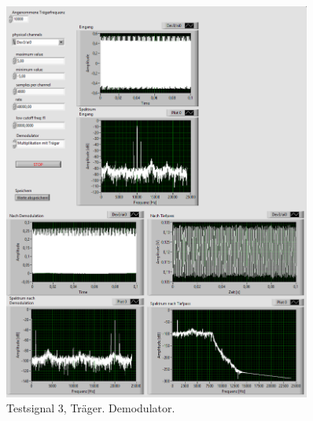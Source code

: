 \newpage

\begin{figure}[H]
	\centering
	\includegraphics[width=0.9\textwidth]{pic/dam_3_traeger.png}
	\caption{Testsignal 3, Träger. Demodulator.}
	\label{fig:a4}	
\end{figure}

\newpage

